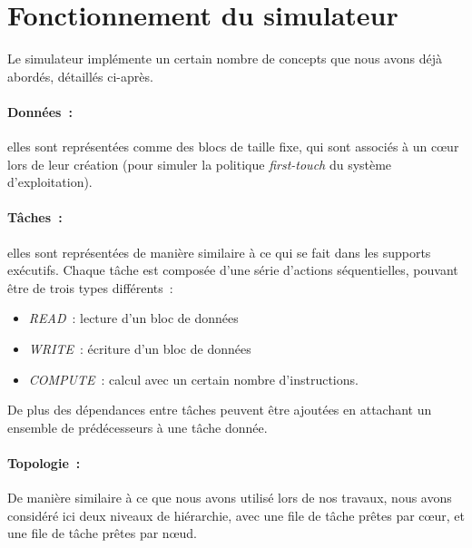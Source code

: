 \section{Fonctionnement du simulateur}\label{sec:simulation:archi}

Le simulateur implémente un certain nombre de concepts que nous avons déjà abordés, détaillés ci-après.


\paragraph{Données~:} elles sont représentées comme des blocs de taille fixe, qui sont associés à un cœur lors de leur création (pour simuler la politique \emph{first-touch} du système d'exploitation).

\paragraph{Tâches~:} elles sont représentées de manière similaire à ce qui se fait dans les supports exécutifs.
Chaque tâche est composée d'une série d'actions séquentielles, pouvant être de trois types différents~:
\begin{itemize}
  \item \emph{READ}~: lecture d'un bloc de données
  \item \emph{WRITE}~: écriture d'un bloc de données
  \item \emph{COMPUTE}~: calcul avec un certain nombre d'instructions.
\end{itemize}

De plus des dépendances entre tâches peuvent être ajoutées en attachant un ensemble de prédécesseurs à une tâche donnée.

\paragraph{Topologie~:}
De manière similaire à ce que nous avons utilisé lors de nos travaux, nous avons considéré ici deux niveaux de hiérarchie, avec une file de tâche prêtes par cœur, et une file de tâche prêtes par nœud.

